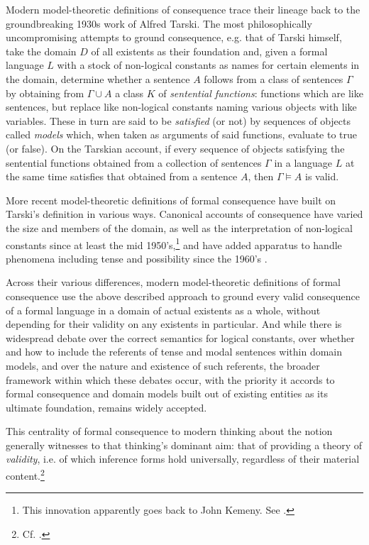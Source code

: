 \documentclass[a4paper, 11pt]{article}
\begin{document}
Modern model-theoretic definitions of consequence trace their lineage back to the groundbreaking 1930s work of Alfred Tarski. The most philosophically uncompromising attempts to ground consequence, e.g. that of Tarski himself, take the domain $D$ of all existents as their foundation and, given a formal language $L$ with a stock of non-logical constants as names for certain elements in the domain, determine whether a sentence $A$ follows from a class of sentences $\Gamma$ by obtaining  from $\Gamma \cup A$ a class $K$ of \emph{sentential functions}: functions which are like sentences, but replace like non-logical constants naming various objects with like variables. These in turn are said to be \emph{satisfied} (or not) by sequences of objects called \emph{models} which, when taken as arguments of said functions, evaluate to true (or false). On the Tarskian account, if every sequence of objects satisfying the sentential functions obtained from a collection of sentences $\Gamma$ in a language $L$ at the same time satisfies that obtained from a sentence $A$, then $\Gamma \vDash A$ is valid. 

More recent model-theoretic definitions of formal consequence have built on Tarski's definition in various ways. Canonical accounts of consequence have varied the size and members of the domain, as well as the interpretation of non-logical constants since at least the mid 1950's,\footnote{This innovation apparently goes back to John Kemeny. See \autocite{Schiemer2013,Kemeny1956,Kemeny1956b}.} and have added apparatus to handle phenomena including tense and possibility since the 1960's \autocite{Kripke1963a}. 

Across their various differences, modern model-theoretic definitions of formal consequence use the above described approach to ground every valid consequence of a formal language in a domain of actual existents as a whole, without depending for their validity on any existents in particular. And while there is widespread debate over the correct semantics for logical constants, over whether and how to include the referents of tense and modal sentences within domain models, and over the nature and existence of such referents, the broader framework within which these debates occur, with the priority it accords to formal consequence and domain models built out of existing entities as its ultimate foundation, remains widely accepted.

This centrality of formal consequence to modern thinking about the notion generally witnesses to that thinking's dominant aim: that of providing a theory of \emph{validity}, i.e. of which inference forms hold universally, regardless of their material content.\footnote{Cf. \autocite{DutilhNovaes2011,Etchemendy2008,MacFarlane2000}.} 
\end{document}
